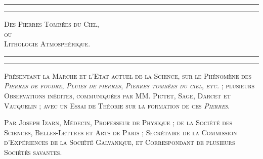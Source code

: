 \documentclass[a4paper, 11pt, oneside, polutonikogreek, french]{article}
\begin{document}
\renewcommand{\contentsname}{
\Fontauri{Table des matières}
}
\begin{titlepage} %
	\centering %

	
	\rule{\textwidth}{1.6pt}\vspace*{-\baselineskip}\vspace*{2pt} %
	\rule{\textwidth}{0.4pt} %
	
	\vspace{1\baselineskip} %
	
	{\scshape\Huge Des Pierres Tombées du Ciel,\\ ou\\ Lithologie Atmosphérique.}
	
	\vspace{1\baselineskip} %

	\rule{\textwidth}{0.4pt}\vspace*{-\baselineskip}\vspace{3.2pt} %
	\rule{\textwidth}{1.6pt} %
	
	\vspace{1\baselineskip} %
	
	
	{\scshape \Large Présentant la Marche et l'Etat actuel de la Science, sur le Phénomène des \emph{Pierres de foudre}, \emph{Pluies de pierres}, \emph{Pierres tombées du ciel}, \emph{etc.} ; plusieurs Observations inédites, communiquées par MM. Pictet, Sage, Darcet et Vauquelin ; avec un Essai de Théorie sur la formation de ces \emph{Pierres}.} %
	
	\vspace*{1\baselineskip} %
	
        {\scshape Par Joseph Izarn, Médecin, Professeur de Physique ; de la Société des Sciences, Belles-Lettres et Arts de Paris ; Secrétaire de la Commission d'Expériences de la Société Galvanique, et Correspondant de plusieurs Sociétés savantes. } %
    

\end{titlepage}
\end{document}
